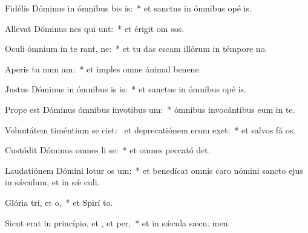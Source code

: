 \item Fidélis Dóminus in ómnibus bis is:~* et sanctus in ómnibus opé is.
\item Allevat Dóminus nes qui unt:~* et érigit om sos.
\item Oculi ómnium in te rant, ne:~* et tu das escam illórum in témpore no.
\item Aperis tu num am:~* et imples omne ánimal benene.
\item Justus Dóminus in ómnibus is is:~* et sanctus in ómnibus opé is.
\item Prope est Dóminus ómnibus invotibus um:~* ómnibus invocántibus eum in te.
\item Voluntátem timéntium se ciet:~\pscross{} et deprecatiónem erum exet:~* et salvos fá os.
\item Custódit Dóminus omnes li se:~* et omnes peccató det.
\item Laudatiónem Dómini lotur os um:~* et benedícat omnis caro nómini sancto ejus in sǽculum, et in sǽ culi.
\item Glória tri, et o,~* et Spirí to.
\item Sicut erat in princípio, et , et per,~* et in sǽcula sæcu. men.
